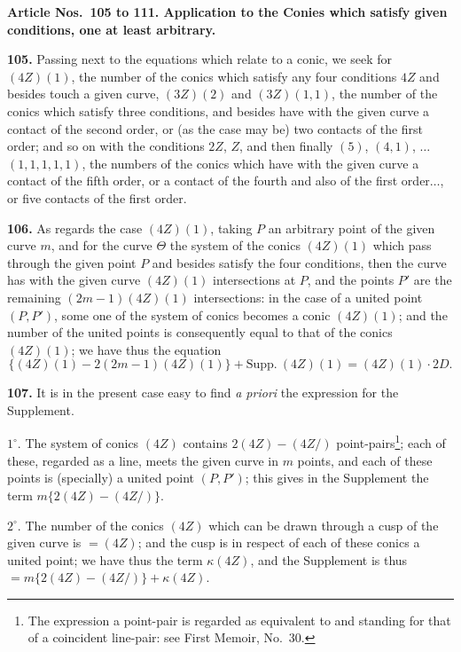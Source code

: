 \documentclass[11pt,a4paper]{article}
\theoremstyle{definition}
\begin{document}
\vspace{6pt}
\noindent\textbf{Article Nos.~105 to 111. Application to the Conies which satisfy given conditions, one at least arbitrary.}

\medskip
\noindent\textbf{105.} Passing next to the equations which relate to a conic, we seek for $(4Z)(1)$, the number of the conics which satisfy any four conditions $4Z$ and besides touch a given curve, $(3Z)(2)$ and $(3Z)(1, 1)$, the number of the conics which satisfy three conditions, and besides have with the given curve a contact of the second order, or (as the case may be) two contacts of the first order; and so on with the conditions $2Z$, $Z$, and then finally $(5)$, $(4, 1)$, $\ldots$ $(1, 1, 1, 1, 1)$, the numbers of the conics which have with the given curve a contact of the fifth order, or a contact of the fourth and also of the first order$\ldots$, or five contacts of the first order.

\medskip
\noindent\textbf{106.} As regards the case $(4Z)(1)$, taking $P$ an arbitrary point of the given curve $m$, and for the curve $\Theta$ the system of the conics $(4Z)(1)$ which pass through the given point $P$ and besides satisfy the four conditions, then the curve has with the given curve $(4Z)(1)$ intersections at $P$, and the points $P'$ are the remaining $(2m - 1)(4Z)(1)$ intersections: in the case of a united point $(P, P')$, some one of the system of conics becomes a conic $(4Z)(1)$; and the number of the united points is consequently equal to that of the conics $(4Z)(1)$; we have thus the equation
\[
\{(4Z)(1) - 2(2m - 1)(4Z)(1)\} + \text{Supp.}\ (4Z)(1) = (4Z)(1) \cdot 2D.
\]

\noindent\textbf{107.} It is in the present case easy to find \textit{a priori} the expression for the Supplement.

$1^\circ$. The system of conics $(4Z)$ contains $2(4Z) - (4Z/)$ point-pairs\footnote{The expression a point-pair is regarded as equivalent to and standing for that of a coincident line-pair: see First Memoir, No.~30.}; each of these, regarded as a line, meets the given curve in $m$ points, and each of these points is (specially) a united point $(P, P')$; this gives in the Supplement the term $m\{2(4Z) - (4Z/)\}$.

$2^\circ$. The number of the conics $(4Z)$ which can be drawn through a cusp of the given curve is $= (4Z)$; and the cusp is in respect of each of these conics a united point; we have thus the term $\kappa(4Z)$, and the Supplement is thus $= m\{2(4Z) - (4Z/)\} + \kappa(4Z)$.
\end{document}
